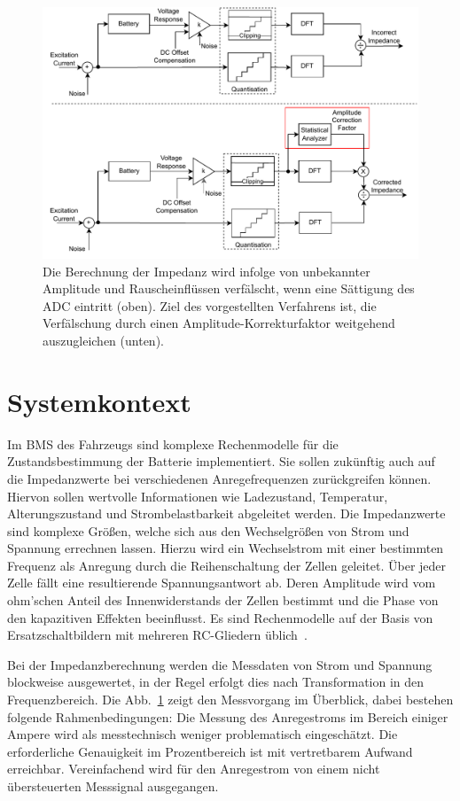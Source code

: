 \begin{figure}[tbh!] 
	\centering 
	\includegraphics[width=1.02\textwidth]{../img/system.pdf}
	\caption{Die Berechnung der Impedanz wird infolge von unbekannter Amplitude und Rauscheinflüssen verfälscht, wenn eine Sättigung des ADC eintritt (oben). Ziel des vorgestellten Verfahrens ist, die Verfälschung durch einen Amplitude-Korrekturfaktor weitgehend auszugleichen (unten).}
	\label{fig:system}
\end{figure}

\section{Systemkontext}
Im BMS des Fahrzeugs sind komplexe Rechenmodelle für die Zustandsbestimmung der Batterie implementiert. Sie sollen zukünftig auch auf die Impedanzwerte bei verschiedenen Anregefrequenzen zurückgreifen können. Hiervon sollen wertvolle Informationen wie Ladezustand, Temperatur, Alterungszustand und Strombelastbarkeit abgeleitet werden. Die Impedanzwerte sind komplexe Größen, welche sich aus den Wechselgrößen von Strom und Spannung errechnen lassen. Hierzu wird ein Wechselstrom mit einer bestimmten Frequenz als Anregung durch die Reihenschaltung der Zellen geleitet. Über jeder Zelle fällt eine resultierende Spannungsantwort ab. Deren Amplitude wird vom ohm'schen Anteil des Innenwiderstands der Zellen bestimmt und die Phase von den kapazitiven Effekten beeinflusst. Es sind Rechenmodelle auf der Basis von Ersatzschaltbildern mit mehreren RC-Gliedern üblich~\cite{KeilJossen-2012}.

\smallskip
Bei der Impedanzberechnung werden die Messdaten von Strom und Spannung blockweise ausgewertet, in der Regel erfolgt dies nach Transformation in den Frequenzbereich. Die Abb.~\ref{fig:system} zeigt den Messvorgang im Überblick, dabei bestehen folgende Rahmenbedingungen: Die Messung des Anregestroms im Bereich einiger Ampere wird als messtechnisch weniger problematisch eingeschätzt. Die erforderliche Genauigkeit im Prozentbereich ist mit vertretbarem Aufwand erreichbar. Vereinfachend wird für den Anregestrom von einem nicht übersteuerten Messsignal ausgegangen. 

